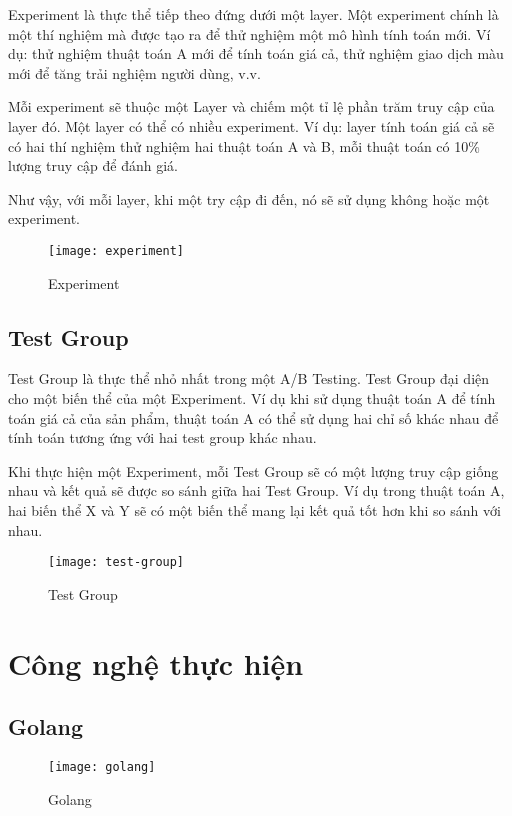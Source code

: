 Experiment là thực thể tiếp theo đứng dưới một layer. Một experiment chính là một thí nghiệm mà được tạo ra để thử nghiệm một mô hình tính toán mới. Ví dụ: thử nghiệm thuật toán A mới để tính toán giá cả, thử nghiệm giao dịch màu mới để tăng trải nghiệm người dùng, v.v.

Mỗi experiment sẽ thuộc một Layer và chiếm một tỉ lệ phần trăm truy cập của layer đó. Một layer có thể có nhiều experiment. Ví dụ: layer tính toán giá cả sẽ có hai thí nghiệm thử nghiệm hai thuật toán A và B, mỗi thuật toán có 10\% lượng truy cập để đánh giá.

Như vậy, với mỗi layer, khi một try cập đi đến, nó sẽ sử dụng không hoặc một experiment.

\begin{figure}[ht]
	\centering
	\texttt{[image: experiment]}
	\caption{Experiment}
\end{figure}

\subsection{Test Group}

Test Group là thực thể nhỏ nhất trong một A/B Testing. Test Group đại diện cho một biến thể của một Experiment. Ví dụ khi sử dụng thuật toán A để tính toán giá cả của sản phẩm, thuật toán A có thể sử dụng hai chỉ số khác nhau để tính toán tương ứng với hai test group khác nhau.

Khi thực hiện một Experiment, mỗi Test Group sẽ có một lượng truy cập giống nhau và kết quả sẽ được so sánh giữa hai Test Group. Ví dụ trong thuật toán A, hai biến thể X và Y sẽ có một biến thể mang lại kết quả tốt hơn khi so sánh với nhau.

\begin{figure}[ht]
	\centering
	\texttt{[image: test-group]}
	\caption{Test Group}
\end{figure}

\section{Công nghệ thực hiện}

\subsection{Golang}

\begin{figure}[ht]
	\centering
	\texttt{[image: golang]}
	\caption{Golang}
\end{figure}

